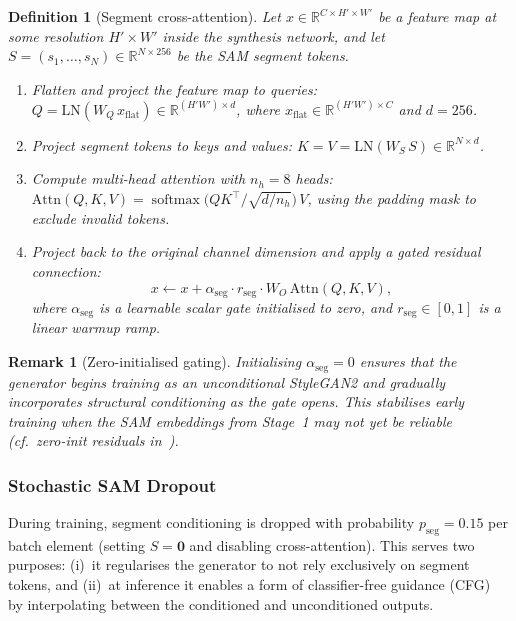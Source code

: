 \documentclass[12pt]{article}
\newtheorem{definition}[theorem]{Definition}
\newtheorem{remark}[theorem]{Remark}
\DeclareMathOperator{\softmax}{softmax}
\begin{document}
\begin{definition}[Segment cross-attention]
\label{def:seg-cross-attn}
Let $x \in \mathbb{R}^{C \times H' \times W'}$ be a feature map at some
resolution $H' \times W'$ inside the synthesis network,
and let $S = (s_1, \ldots, s_N) \in \mathbb{R}^{N \times 256}$
be the SAM segment tokens.
\begin{enumerate}
    \item Flatten and project the feature map to queries:
    $Q = \mathrm{LN}(W_Q\, x_{\mathrm{flat}}) \in \mathbb{R}^{(H'W') \times d}$,
    where $x_{\mathrm{flat}} \in \mathbb{R}^{(H'W') \times C}$ and $d = 256$.
    \item Project segment tokens to keys and values:
    $K = V = \mathrm{LN}(W_S\, S) \in \mathbb{R}^{N \times d}$.
    \item Compute multi-head attention with $n_h = 8$ heads:
    $\mathrm{Attn}(Q, K, V) = \softmax\!\bigl(QK^\top / \sqrt{d/n_h}\bigr)\, V$,
    using the padding mask to exclude invalid tokens.
    \item Project back to the original channel dimension and apply a
    \emph{gated residual connection}:
    \begin{equation}\label{eq:gated-residual}
        x \leftarrow x + \alpha_{\mathrm{seg}} \cdot r_{\mathrm{seg}}
        \cdot W_O\, \mathrm{Attn}(Q, K, V),
    \end{equation}
    where $\alpha_{\mathrm{seg}}$ is a \emph{learnable scalar gate}
    initialised to zero, and $r_{\mathrm{seg}} \in [0,1]$ is a
    linear warmup ramp.
\end{enumerate}
\end{definition}

\begin{remark}[Zero-initialised gating]
\label{rem:zero-gate}
Initialising $\alpha_{\mathrm{seg}} = 0$ ensures that the generator
begins training as an \emph{unconditional} StyleGAN2 and
gradually incorporates structural conditioning as the gate opens.
This stabilises early training when the SAM embeddings from Stage~1
may not yet be reliable
(cf.\ zero-init residuals in~\cite{bachlechner2021rezero,goyal2017accurate}).
\end{remark}

\subsubsection{Stochastic SAM Dropout}

During training, segment conditioning is dropped with probability
$p_{\mathrm{seg}} = 0.15$ per batch element (setting $S = \mathbf{0}$
and disabling cross-attention).
This serves two purposes:
(i)~it regularises the generator to not rely exclusively on segment
tokens, and
(ii)~at inference it enables a form of classifier-free guidance
(CFG)~\cite{ho2022cfg} by interpolating between the conditioned and
unconditioned outputs.
\end{document}
